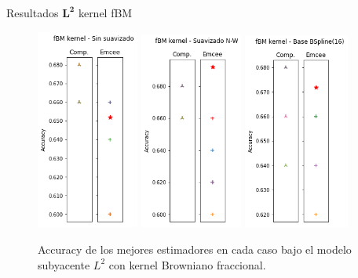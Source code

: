\documentclass[10pt, professionalfonts]{beamer}
\begin{document}

\begin{frame}{Resultados $\boldsymbol{L^2}$ kernel fBM}
  \begin{figure}
    \includegraphics[width=0.3\textwidth]{img/results-new/clf_l2_fbm_none}\hfill
    \includegraphics[width=0.3\textwidth]{img/results-new/clf_l2_fbm_nw}\hfill
    \includegraphics[width=0.31\textwidth]{img/results-new/clf_l2_fbm_basis}
    \caption{Accuracy de los mejores estimadores en cada caso bajo el modelo subyacente $L^2$ con kernel Browniano fraccional.}
  \end{figure}
\end{frame}
\end{document}
